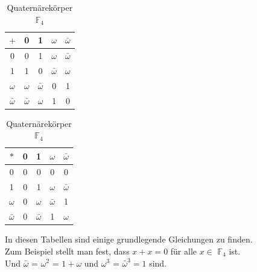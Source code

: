 \begin{definition}[Körper]
    
    \begin{table}[!h]
        \begin{center}
          \caption{Quaternärekörper $\mathbb{F}_4$}
          \label{tab:quaternäre Körper5}
          \begin{tabular}{c|cccc}
            $+$ & 0 & 1 & $\omega$ & $\bar\omega$ \\
            \hline
            0 & 0 & 1 & $\omega$ & $\bar\omega$ \\
            1 & 1 & 0 & $\bar\omega$ & $\omega$ \\
            $\omega$ & $\omega$ & $\bar\omega$ & 0 & 1 \\
            $\bar\omega$ & $\bar\omega$ & $\omega$ & 1 & 0 \\
          \end{tabular}
          \end{center}
      \end{table}
    
    
    \hfill
    
        \begin{table}[!h]
        \begin{center}
            \caption{Quaternärekörper $\mathbb{F}_4$}
                \label{tab:quaternäre Körper6}
            \begin{tabular}{c|cccc}
            $*$ & 0 & 1 & $\omega$ & $\bar\omega$ \\
            \hline
            0 & 0 & 0 & 0 & 0 \\
            1 & 0 & 1 & $\omega$ & $\bar\omega$ \\
            $\omega$& 0 & $\omega$ & $\bar\omega$ & 1 \\
            $\bar\omega$& 0 & $\bar\omega$& 1 & $\omega$ \\
            \end{tabular}
            \end{center}
        \end{table}
    
       
    
    \FloatBarrier
    
    In diesen Tabellen sind einige grundlegende Gleichungen zu finden.\\
    Zum Beispiel stellt man fest, dass \( x + x = 0 \) für alle \(x\in\) $\mathbb{F}_4$ ist.\\ 
    Und $\bar\omega$ = $\omega^{2}$ = \( 1 + \omega \) und $\omega^{3}$ = $\bar\omega^{3} = 1$ sind.\cite[S. 3]{huffman} \\
\end{definition}


